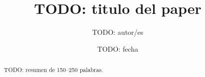 \documentclass[11pt]{article}
\title{TODO: titulo del paper}
\author{TODO: autor/es}
\date{TODO: fecha}
\begin{document}
\maketitle

\begin{abstract}
TODO: resumen de 150--250 palabras.
\end{abstract}








\appendix




\end{document}

